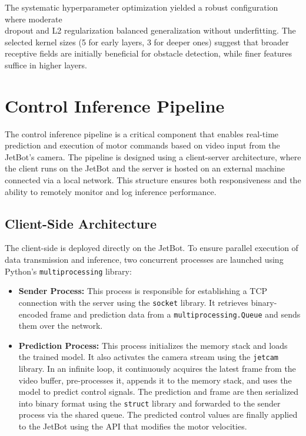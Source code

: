 The systematic hyperparameter optimization yielded a robust configuration where moderate \\ dropout and L2 regularization balanced generalization without underfitting. The selected kernel sizes (5 for early layers, 3 for deeper ones) suggest that broader receptive fields are initially beneficial for obstacle detection, while finer features suffice in higher layers.

\section{Control Inference Pipeline}
\label{sec:pipeline}

The control inference pipeline is a critical component that enables real-time prediction and execution of motor commands based on video input from the JetBot's camera. The pipeline is designed using a client-server architecture, where the client runs on the JetBot and the server is hosted on an external machine connected via a local network. This structure ensures both responsiveness and the ability to remotely monitor and log inference performance.

\subsection{Client-Side Architecture}

The client-side is deployed directly on the JetBot. To ensure parallel execution of data transmission and inference, two concurrent processes are launched using Python's \texttt{multiprocessing} library:

\begin{itemize}
  \item \textbf{Sender Process:} This process is responsible for establishing a TCP connection with the server using the \texttt{socket} library. It retrieves binary-encoded frame and prediction data from a \texttt{multiprocessing.Queue} and sends them over the network.

  \item \textbf{Prediction Process:} This process initializes the memory stack and loads the trained model. It also activates the camera stream using the \texttt{jetcam} library. In an infinite loop, it continuously acquires the latest frame from the video buffer, pre-processes it, appends it to the memory stack, and uses the model to predict control signals. The prediction and frame are then serialized into binary format using the \texttt{struct} library and forwarded to the sender process via the shared queue. The predicted control values are finally applied to the JetBot using the API that modifies the motor velocities.
\end{itemize}

